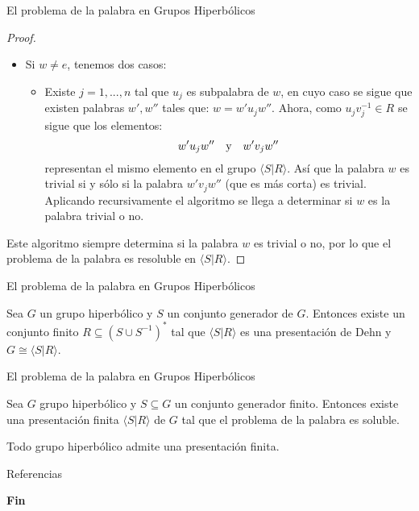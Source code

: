 \documentclass[xcolor=dvipsnames]{beamer}
\theoremstyle{largebreak}
\newcommand{\gen}[1]{\ensuremath{\langle#1\rangle}}
\begin{document}
\begin{frame}{El problema de la palabra en Grupos Hiperbólicos}
    \begin{proof}
        \begin{itemize}
            \item Si $w\neq e$, tenemos dos casos:
            \begin{itemize}
                \item Existe $j=1,...,n$ tal que $u_j$ es subpalabra de $w$, en cuyo caso se sigue que existen palabras $w',w''$ tales que: $w=w'u_jw''$. Ahora, como $u_jv_j^{-1}\in R$ se sigue que los elementos:
                \begin{equation*}
                    w'u_jw''\quad\textup{y}\quad w'v_jw''
                \end{equation*}
                representan el mismo elemento en el grupo $\gen{S|R}$. Así que la palabra $w$ es trivial si y sólo si la palabra $w'v_jw''$ (que es más corta) es trivial. Aplicando recursivamente el algoritmo se llega a determinar si $w$ es la palabra trivial o no.
            \end{itemize}
        \end{itemize}
        Este algoritmo siempre determina si la palabra $w$ es trivial o no, por lo que el problema de la palabra es resoluble en $\gen{S|R}$.
    \end{proof}
\end{frame}

\begin{frame}{El problema de la palabra en Grupos Hiperbólicos}
    \begin{theor}
        Sea $G$ un grupo hiperbólico y $S$ un conjunto generador de $G$. Entonces existe un conjunto finito $R\subseteq(S\cup S^{-1})^*$ tal que $\gen{S|R}$ es una presentación de Dehn y $G\cong\gen{S|R}$.
    \end{theor}
\end{frame}

\begin{frame}{El problema de la palabra en Grupos Hiperbólicos}
    \begin{cor}
        Sea $G$ grupo hiperbólico y $S\subseteq G$ un conjunto generador finito. Entonces existe una presentación finita $\gen{S|R}$ de $G$ tal que el problema de la palabra es soluble.
    \end{cor}

    \begin{cor}
        Todo grupo hiperbólico admite una presentación finita.
    \end{cor}
\end{frame}

\begin{frame}{Referencias}
    \footnotesize
    
    
\end{frame}

\begin{frame}
    \Huge{\centerline{\textbf{Fin}}}
\end{frame}
\end{document}
